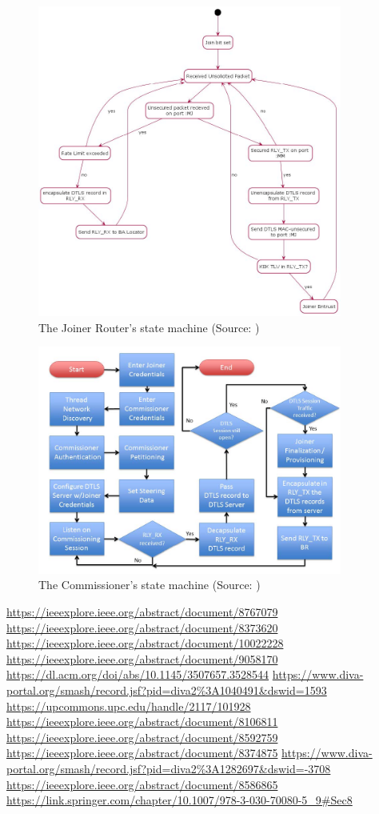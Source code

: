\begin{figure}[!ht]
    \centering
    \includegraphics[width=100mm, keepaspectratio]{figures/joiner-rt-smFinal_12639Thread_1.3.jpg}
    \caption{The Joiner Router's state machine (Source: \cite{thread:130})}
    \label{fig:ot:joiner-rt-sm}
\end{figure}

\begin{figure}[!ht]
    \centering
    \includegraphics[width=100mm, keepaspectratio]{figures/commissioner-sm-Final_12639Thread_1.3.jpg}
    \caption{The Commissioner's state machine (Source: \cite{thread:130})}
    \label{fig:ot:commissioner-sm}
\end{figure}

\url{https://ieeexplore.ieee.org/abstract/document/8767079}
\url{https://ieeexplore.ieee.org/abstract/document/8373620}
\url{https://ieeexplore.ieee.org/abstract/document/10022228}
\url{https://ieeexplore.ieee.org/abstract/document/9058170}
\url{https://dl.acm.org/doi/abs/10.1145/3507657.3528544}
\url{https://www.diva-portal.org/smash/record.jsf?pid=diva2%3A1040491&dswid=1593}
\url{https://upcommons.upc.edu/handle/2117/101928}
\url{https://ieeexplore.ieee.org/abstract/document/8106811}
\url{https://ieeexplore.ieee.org/abstract/document/8592759}
\url{https://ieeexplore.ieee.org/abstract/document/8374875}
\url{https://www.diva-portal.org/smash/record.jsf?pid=diva2%3A1282697&dswid=-3708}
\url{https://ieeexplore.ieee.org/abstract/document/8586865}
\url{https://link.springer.com/chapter/10.1007/978-3-030-70080-5_9#Sec8}
